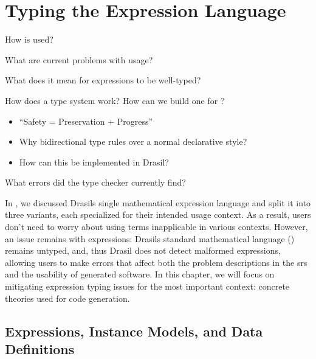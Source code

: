 \chapter{Typing the Expression Language}
\label{chap:typed-expr}

\begin{writingdirectives}
      \item How is \Expr{} used?
      \item What are current problems with \Expr{} usage?
      \item What does it mean for expressions to be well-typed?
      \item How does a type system work? How can we build one for \Expr{}?
            \begin{itemize}
                  \item ``Safety = Preservation + Progress'' \cite{Harper2016}
                  \item Why bidirectional type rules over a normal declarative
                        style?
                  \item How can this be implemented in Drasil?
            \end{itemize}
      \item What errors did the type checker currently find?
\end{writingdirectives}

In , we discussed Drasils single mathematical
expression language and split it into three variants, each specialized for their
intended usage context. As a result, users don't need to worry about using terms
inapplicable in various contexts. However, an issue remains with expressions:
Drasils standard mathematical language (\Expr{}) remains untyped, and, thus
Drasil does not detect malformed expressions, allowing users to make errors that
affect both the problem descriptions in the \acs{srs} and the usability of
generated software. In this chapter, we will focus on mitigating expression
typing issues for the most important context: concrete theories used for code
generation.

\section{Expressions, Instance Models, and Data Definitions}
\label{chap:typed-expr:sec:expressions-instance-models-and-data-definitions}


